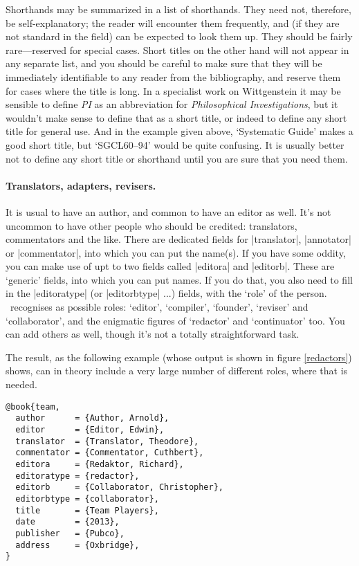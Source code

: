 Shorthands may be summarized in a list of shorthands. They need not,
therefore, be self-explanatory; the reader will encounter them
frequently, and (if they are not standard in the field) can be
expected to look them up. They should be fairly rare---reserved for
special cases. Short titles on the other hand will not appear in any
separate list, and you should be careful to make sure that they will
be immediately identifiable to any reader from the bibliography, and
reserve them for cases where the title is long. In a specialist work
on Wittgenstein it may be sensible to define \emph{PI} as an
abbreviation for \emph{Philosophical Investigations}, but it wouldn't
make sense to define that as a short title, or indeed to define any
short title for general use. And in the example given above,
`Systematic Guide' makes a good short title, but `SGCL60--94' would be
quite confusing. It is usually better not to define any short title or
shorthand until you are sure that you need them.

\paragraph{Translators, adapters, revisers.} It is usual to have an
author, and common to have an editor as well. It's not uncommon to
have other people who should be credited: translators, commentators
and the like. There are dedicated fields for |translator|, |annotator|
or |commentator|, into which you can put the name(s). If you have some
oddity, you can make use of upt to two fields called |editora| and
|editorb|. These are `generic' fields, into which you can put
names. If you do that, you also need to fill in the |editoratype| (or
|editorbtype| ...) fields, with the `role' of the person. \biblatex\
recognises as possible roles: `editor', `compiler', `founder',
`reviser' and `collaborator', and the enigmatic figures of `redactor'
and `continuator' too. You can add others as well, though it's not a
totally straightforward task.\intref{See \emph{Manual} \S\S~2.3.6, 3.8
  and 4.9.1.}

The result, as the following example (whose output is shown in figure
\ref{redactors}) shows, can in theory include a very large number of
different roles, where that is needed.
\begin{Verbatim}
@book{team,
  author      = {Author, Arnold},
  editor      = {Editor, Edwin},
  translator  = {Translator, Theodore},
  commentator = {Commentator, Cuthbert},
  editora     = {Redaktor, Richard},
  editoratype = {redactor},
  editorb     = {Collaborator, Christopher},
  editorbtype = {collaborator},
  title       = {Team Players},
  date        = {2013},
  publisher   = {Pubco},
  address     = {Oxbridge},
}
\end{Verbatim}

